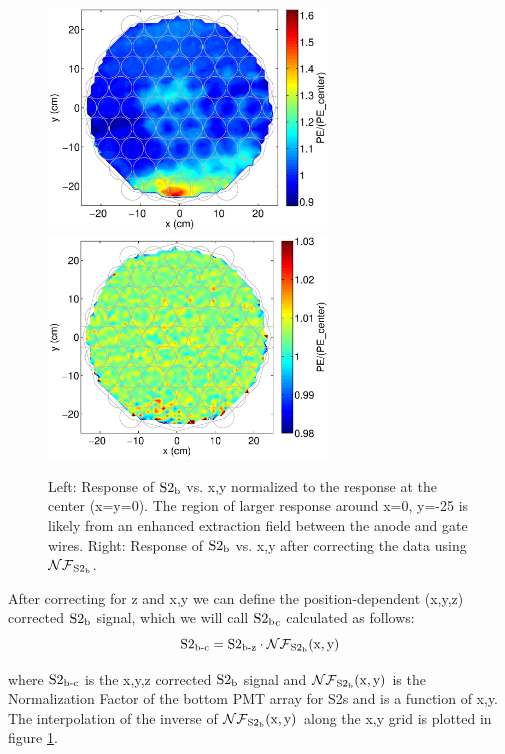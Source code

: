 \begin{figure}[h!]\centering
\includegraphics[width=74mm]{Chapter_XYZ_Corr/Thesis_Corr_Plots/S2_b_1cm_1cm/S2_b_XY_1cm_norm.eps}
\includegraphics[width=74mm]{Chapter_XYZ_Corr/Thesis_Corr_Plots/S2_b_1cm_1cm/S2_b_XY_1cm_norm_FlatField.eps}
\caption{Left: Response of $\rm S2_b$ vs. x,y normalized to the response at the center (x=y=0). The region of larger response around x=0, y=-25 is likely from an enhanced extraction field between the anode and gate wires. Right: Response of $\rm S2_b$ vs. x,y after correcting the data using $\rm\mathcal{NF}_{S2_b}$. }
\label{fig:S2_XY_norm_center}
\end{figure}


After correcting for z and x,y we can define the position-dependent  (x,y,z) corrected $\rm S2_b$ signal, which we will call $\rm S2{_b}_c$ calculated as follows:
\begin{equation}
\rm S2_{\operatorname{b-c}}=S2_{\operatorname{b-z}} \cdot \mathcal{NF}_{S2_b}(x,y) %
\label{eq:S2_XYZ}
\end{equation}

\noindent where $\rm S2_{\operatorname{b-c}}$ is the x,y,z corrected $\rm S2_b$ signal and $\rm \mathcal{NF}_{S2_b}(x,y)$ is the Normalization Factor of the bottom PMT array for S2s and is a function of x,y. The interpolation of the inverse of $\rm \mathcal{NF}_{S2_b}(x,y)$ along the x,y grid is plotted in figure \ref{fig:S2_XY_norm_center}.


